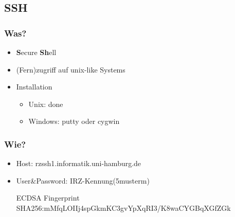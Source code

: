 \documentclass{beamer}
\begin{document}
    \subsection{SSH}
    \begin{frame}
        \frametitle{Was?}
        \begin{itemize}
            \item \textbf{S}ecure \textbf{Sh}ell
            \item (Fern)zugriff auf unix-like Systems
            \item Installation
            \begin{itemize}
            \item Unix: done
            \item Windows: putty oder cygwin
            \end{itemize}
        \end{itemize}
    \end{frame}
    \begin{frame}
        \frametitle{Wie?}
        \begin{itemize}
            \item Host: rzssh1.informatik.uni-hamburg.de
            \item User\&Password: IRZ-Kennung(5musterm)
            \begin{block}{ECDSA Fingerprint}
                SHA256:mMfqLOIIj4spGkmKC3gvYpXqRI3/K8waCYGBqXGfZGk
            \end{block}
        \end{itemize}
    \end{frame}
\end{document}
